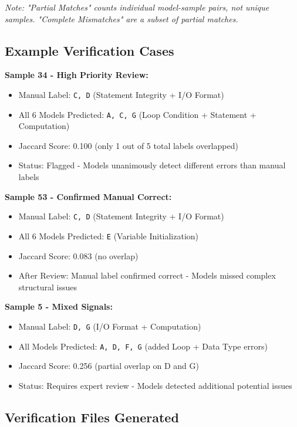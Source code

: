 \documentclass[12pt,a4paper]{article}
\begin{document}
\textit{Note: "Partial Matches" counts individual model-sample pairs, not unique samples. "Complete Mismatches" are a subset of partial matches.}

\subsection{Example Verification Cases}

\textbf{Sample 34 - High Priority Review:}
\begin{itemize}[leftmargin=*]
    \item Manual Label: \texttt{C, D} (Statement Integrity + I/O Format)
    \item All 6 Models Predicted: \texttt{A, C, G} (Loop Condition + Statement + Computation)
    \item Jaccard Score: 0.100 (only 1 out of 5 total labels overlapped)
    \item Status: Flagged - Models unanimously detect different errors than manual labels
\end{itemize}

\textbf{Sample 53 - Confirmed Manual Correct:}
\begin{itemize}[leftmargin=*]
    \item Manual Label: \texttt{C, D} (Statement Integrity + I/O Format)
    \item All 6 Models Predicted: \texttt{E} (Variable Initialization)
    \item Jaccard Score: 0.083 (no overlap)
    \item After Review: Manual label confirmed correct - Models missed complex structural issues
\end{itemize}

\textbf{Sample 5 - Mixed Signals:}
\begin{itemize}[leftmargin=*]
    \item Manual Label: \texttt{D, G} (I/O Format + Computation)
    \item All Models Predicted: \texttt{A, D, F, G} (added Loop + Data Type errors)
    \item Jaccard Score: 0.256 (partial overlap on D and G)
    \item Status: Requires expert review - Models detected additional potential issues
\end{itemize}

\subsection{Verification Files Generated}
\end{document}
